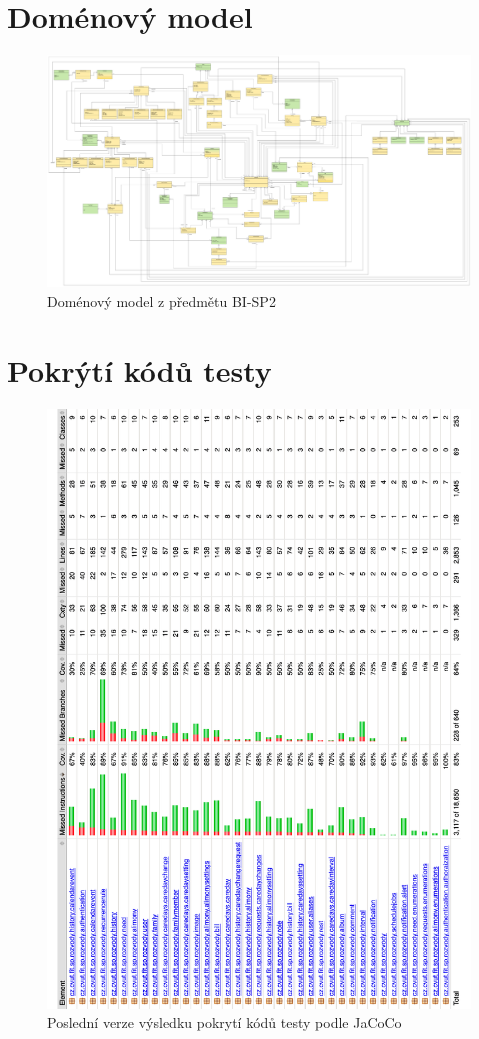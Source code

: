 \chapter{Doménový model}\label{dodatek:DomainModel}
    \begin{figure}\centering
	    \includegraphics[angle=90, width=1.0\textwidth]{pdfs/Domain-Model}
	    \caption[Doménový model]{Doménový model z předmětu BI-SP2}\label{image:DomainModel}
    \end{figure}

\chapter{Pokrýtí kódů testy}\label{dodatek:code-coverage}
    \begin{figure}\centering
	    \includegraphics[width=1.0\textwidth]{pdfs/JaCoCo-results}
	    \caption[Pokrýtí kódů testy podle JaCoCo]{Poslední verze výsledku pokrytí kódů testy podle JaCoCo}\label{image:DomainModel}
    \end{figure}
